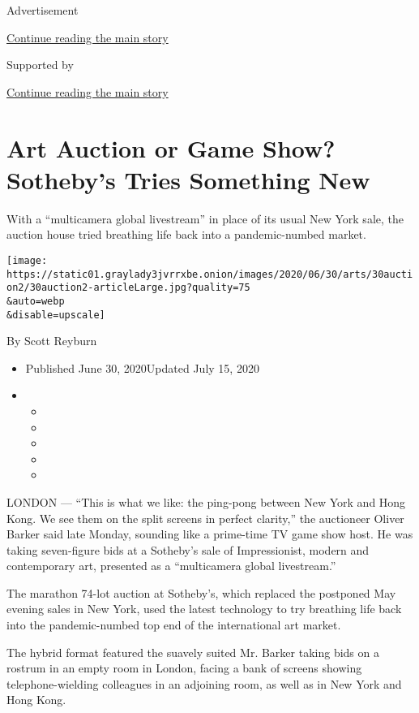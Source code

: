 Advertisement

\protect\hyperlink{after-top}{Continue reading the main story}

Supported by

\protect\hyperlink{after-sponsor}{Continue reading the main story}

\hypertarget{art-auction-or-game-show-sothebys-tries-something-new}{%
\section{Art Auction or Game Show? Sotheby's Tries Something
New}\label{art-auction-or-game-show-sothebys-tries-something-new}}

With a ``multicamera global livestream'' in place of its usual New York
sale, the auction house tried breathing life back into a pandemic-numbed
market.

\texttt{[image: https://static01.graylady3jvrrxbe.onion/images/2020/06/30/arts/30auction2/30auction2-articleLarge.jpg?quality=75\\\&auto=webp\\\&disable=upscale]}

By Scott Reyburn

\begin{itemize}
\item
  Published June 30, 2020Updated July 15, 2020
\item
  \begin{itemize}
  \item
  \item
  \item
  \item
  \item
  \end{itemize}
\end{itemize}

LONDON --- ``This is what we like: the ping-pong between New York and
Hong Kong. We see them on the split screens in perfect clarity,'' the
auctioneer Oliver Barker said late Monday, sounding like a prime-time TV
game show host. He was taking seven-figure bids at a Sotheby's sale of
Impressionist, modern and contemporary art, presented as a ``multicamera
global livestream.''

The marathon 74-lot auction at Sotheby's, which replaced the postponed
May evening sales in New York, used the latest technology to try
breathing life back into the pandemic-numbed top end of the
international art market.

The hybrid format featured the suavely suited Mr. Barker taking bids on
a rostrum in an empty room in London, facing a bank of screens showing
telephone-wielding colleagues in an adjoining room, as well as in New
York and Hong Kong.

